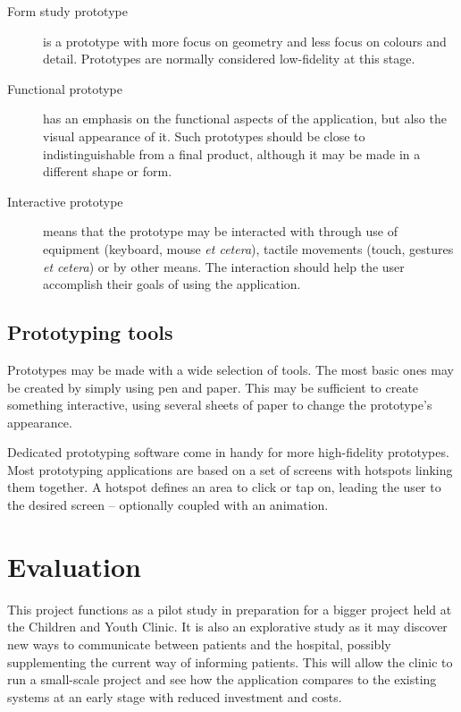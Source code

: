 \begin{description}
    \item[Form study prototype] is a prototype with more focus on geometry and less focus on colours and detail. Prototypes are normally considered low-fidelity at this stage.
    \item[Functional prototype] has an emphasis on the functional aspects of the application, but also the visual appearance of it. Such prototypes should be close to indistinguishable from a final product, although it may be made in a different shape or form.
    \item[Interactive prototype] means that the prototype may be interacted with through use of equipment (keyboard, mouse \emph{et cetera}), tactile movements (touch, gestures \emph{et cetera}) or by other means. The interaction should help the user accomplish their goals of using the application.
\end{description}

\subsection{Prototyping tools}

Prototypes may be made with a wide selection of tools. The most basic ones may be created by simply using pen and paper. This may be sufficient to create something interactive, using several sheets of paper to change the prototype's appearance.

Dedicated prototyping software come in handy for more high-fidelity prototypes. Most prototyping applications are based on a set of screens with hotspots linking them together. A hotspot defines an area to click or tap on, leading the user to the desired screen -- optionally coupled with an animation. %


\section{Evaluation}
\label{sec:evaluation}

This project functions as a pilot study in preparation for a bigger project held at the Children and Youth Clinic. It is also an explorative study as it may discover new ways to communicate between patients and the hospital, possibly supplementing the current way of informing patients. This will allow the clinic to run a small-scale project and see how the application compares to the existing systems at an early stage with reduced investment and costs.

